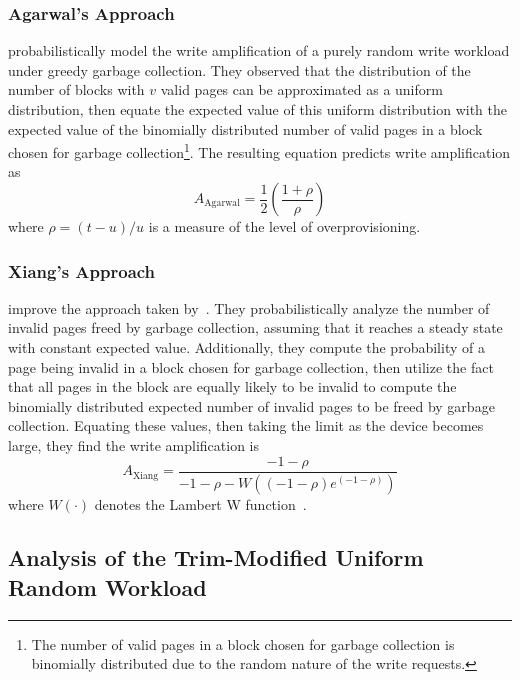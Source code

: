 \documentclass[prodmode,acmtos]{acmsmall}
\begin{document}
\subsubsection{Agarwal's Approach}
 probabilistically model the write amplification of a purely random write workload under greedy garbage collection.  They observed that the distribution of the number of blocks with $v$ valid pages can be approximated as a uniform distribution, then equate the expected value of this uniform distribution with the expected value of the binomially distributed number of valid pages in a block chosen for garbage collection\footnote{The number of valid pages in a block chosen for garbage collection is binomially distributed due to the random nature of the write requests.}.  The resulting equation predicts write amplification as
\begin{equation}\label{eqn:Agar_write_amp}
A_\text{Agarwal} = \frac{1}{2} \left( \frac{1+\rho}{\rho} \right)
\end{equation}
where $\rho = (t-u)/u$ is a measure of the level of overprovisioning.
\subsubsection{Xiang's Approach}
 improve the approach taken by~.  They probabilistically analyze the number of invalid pages freed by garbage collection, assuming that it reaches a steady state with constant expected value.  Additionally, they compute the probability of a page being invalid in a block chosen for garbage collection, then utilize the fact that all pages in the block are equally likely to be invalid to compute the binomially distributed expected number of invalid pages to be freed by garbage collection.  Equating these values, then taking the limit as the device becomes large, they find the write amplification is
\begin{equation}\label{eqn:Xiang_write_amp}
A_\text{Xiang} = \frac{-1-\rho}{-1-\rho-W((-1-\rho)e^{(-1-\rho)})}
\end{equation}
where $W(\cdot)$ denotes the Lambert W function~\cite{corless1996lambertw,xiang2011improved}.


\subsection{Analysis of the Trim-Modified Uniform Random Workload}
\end{document}
